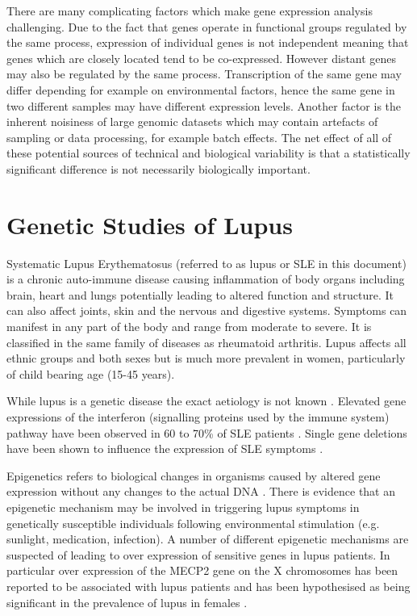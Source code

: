 \documentclass[a4paper, 12pt]{report}
\begin{document}
There are many complicating factors which make gene expression analysis challenging. Due to the fact that genes operate in functional groups regulated by the same process, expression of individual genes is not independent meaning that genes which are closely located tend to be co-expressed. However distant genes may also be regulated by the same process. Transcription of the same gene may differ depending for example on environmental factors, hence the same gene in two different samples may have different expression levels.  Another factor is the inherent noisiness of large genomic datasets which may contain artefacts of sampling or data processing, for example batch effects. The net effect of all of these potential sources of technical and biological variability is that a statistically significant difference is not necessarily biologically important.

\section{Genetic Studies of Lupus}
Systematic Lupus Erythematosus (referred to as lupus or \gls{SLE} in this document) is a chronic auto-immune disease causing inflammation of body organs including brain, heart and  lungs potentially leading to altered function and structure. It can also affect joints, skin and the nervous and digestive systems. Symptoms can manifest in any part of the body and range from moderate to severe.  It is classified in the same family of diseases as rheumatoid arthritis. Lupus affects all ethnic groups and both sexes but is much more prevalent in women, particularly of child bearing age (15-45 years). 

While lupus is a genetic disease the exact aetiology is not known \cite{autoimmune}. Elevated gene expressions of the interferon (signalling proteins used by the immune system) pathway have been observed in 60 to 70\% of SLE patients \cite{autoimmunePollard}. Single gene deletions have been shown to influence the expression of SLE symptoms \cite{autoimmune}. 

Epigenetics refers to biological changes in organisms caused by altered gene expression without any changes to the actual DNA \cite{Pan2009}. There is evidence that an epigenetic mechanism may be involved in triggering lupus symptoms in genetically susceptible individuals following environmental stimulation (e.g. sunlight, medication, infection). A number of different epigenetic mechanisms are suspected of leading to over expression of sensitive genes in lupus patients. In particular over expression of the MECP2 gene on the X chromosomes has been reported to be associated with lupus patients and has been hypothesised as being significant in the prevalence of lupus in females \cite{Pan2009}. 
\end{document}
